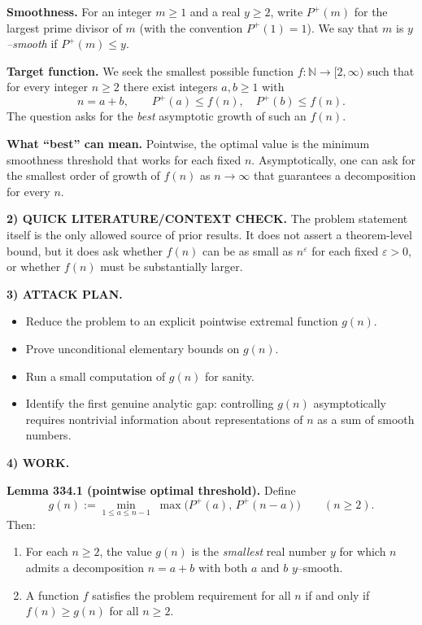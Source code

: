 \medskip
\noindent\textbf{Smoothness.}
For an integer $m\ge 1$ and a real $y\ge 2$, write $P^+(m)$ for the largest prime divisor of $m$ (with the convention $P^+(1)=1$). We say that $m$ is \emph{$y$--smooth} if $P^+(m)\le y$.

\medskip
\noindent\textbf{Target function.}
We seek the smallest possible function $f:\mathbb{N}\to[2,\infty)$ such that for every integer $n\ge 2$ there exist integers $a,b\ge 1$ with
\[
 n=a+b,\qquad P^+(a)\le f(n),\quad P^+(b)\le f(n).
\]
The question asks for the \emph{best} asymptotic growth of such an $f(n)$.

\medskip
\noindent\textbf{What ``best'' can mean.}
Pointwise, the optimal value is the minimum smoothness threshold that works for each fixed $n$. Asymptotically, one can ask for the smallest order of growth of $f(n)$ as $n\to\infty$ that guarantees a decomposition for every $n$.

\medskip
\noindent\textbf{2) QUICK LITERATURE/CONTEXT CHECK.}
The problem statement itself is the only allowed source of prior results. It does not assert a theorem-level bound, but it does ask whether $f(n)$ can be as small as $n^\varepsilon$ for each fixed $\varepsilon>0$, or whether $f(n)$ must be substantially larger.

\medskip
\noindent\textbf{3) ATTACK PLAN.}

\begin{itemize}
\item Reduce the problem to an explicit pointwise extremal function $g(n)$.
\item Prove unconditional elementary bounds on $g(n)$.
\item Run a small computation of $g(n)$ for sanity.
\item Identify the first genuine analytic gap: controlling $g(n)$ asymptotically requires nontrivial information about representations of $n$ as a sum of smooth numbers.
\end{itemize}

\medskip
\noindent\textbf{4) WORK.}

\medskip
\noindent\textbf{Lemma 334.1 (pointwise optimal threshold).}
Define
\[
 g(n) := \min_{1\le a\le n-1}\; \max\bigl(P^+(a),\,P^+(n-a)\bigr)\qquad (n\ge 2).
\]
Then:
\begin{enumerate}
\item[(a)] For each $n\ge 2$, the value $g(n)$ is the \emph{smallest} real number $y$ for which $n$ admits a decomposition $n=a+b$ with both $a$ and $b$ $y$--smooth.
\item[(b)] A function $f$ satisfies the problem requirement for all $n$ if and only if $f(n)\ge g(n)$ for all $n\ge 2$.
\end{enumerate}

